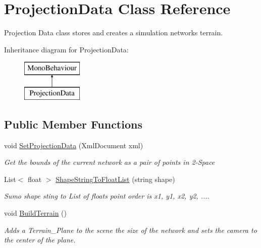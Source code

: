 \hypertarget{class_projection_data}{}\section{Projection\+Data Class Reference}
\label{class_projection_data}


Projection Data class stores and creates a simulation networks terrain.  


Inheritance diagram for Projection\+Data\+:\begin{figure}[H]
\begin{center}
\leavevmode
\includegraphics[height=2.000000cm]{class_projection_data}
\end{center}
\end{figure}
\subsection*{Public Member Functions}
\begin{DoxyCompactItemize}
\item 
void \mbox{\hyperlink{class_projection_data_aa1a7f30d0e2d0dd4a964581d6307e3bb}{Set\+Projection\+Data}} (Xml\+Document xml)
\begin{DoxyCompactList}\small\item\em Get the bounds of the current network as a pair of points in 2-\/Space \end{DoxyCompactList}\item 
List$<$ float $>$ \mbox{\hyperlink{class_projection_data_a9ff12ad53d0ef919479b5cc7168ac59c}{Shape\+String\+To\+Float\+List}} (string shape)
\begin{DoxyCompactList}\small\item\em Sumo shape sting to List of floats point order is x1, y1, x2, y2, .... \end{DoxyCompactList}\item 
void \mbox{\hyperlink{class_projection_data_a7e00204c97b5c3c3e603e2ab55b4793a}{Build\+Terrain}} ()
\begin{DoxyCompactList}\small\item\em Adds a Terrain\+\_\+\+Plane to the scene the size of the network and sets the camera to the center of the plane. \end{DoxyCompactList}\end{DoxyCompactItemize}

